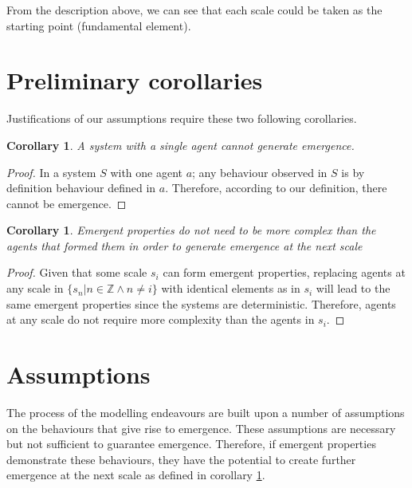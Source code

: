 \documentclass{article}
\newtheorem{corollary}[theorem]{Corollary}
\begin{document}
  From the description above, we can see that each scale could be taken as the starting point (fundamental element).
  

\section{Preliminary corollaries}
  
  Justifications of our assumptions require these two following corollaries.  

  \begin{corollary}
    A system with a single agent cannot generate emergence.
  \label{col:single_agent}
  \end{corollary}
  \begin{proof}

    In a system $S$ with one agent $a$; any behaviour observed in $S$ is by definition behaviour defined in $a$. Therefore, according to our definition, there cannot be emergence. 

  \end{proof}


  \begin{corollary}
    Emergent properties do not need to be more complex than the agents that formed them in order to generate emergence at the next scale
    \label{col:emer_level}
  \end{corollary}
  \begin{proof}

    Given that some scale $s_i$ can form emergent properties, replacing agents at any scale in $\{s_n | n \in \mathbb{Z} \wedge n \not = i \}$ with identical elements as in $s_i$ will lead to the same emergent properties since the systems are deterministic. Therefore, agents at any scale do not require more complexity than the agents in $s_i$.

  \end{proof}


\section{Assumptions}

  The process of the modelling endeavours are built upon a number of assumptions on the behaviours that give rise to emergence. These assumptions are necessary but not sufficient to guarantee emergence. Therefore, if emergent properties demonstrate these behaviours, they have the potential to create further emergence at the next scale as defined in corollary \ref{col:emer_level}. 
\end{document}
